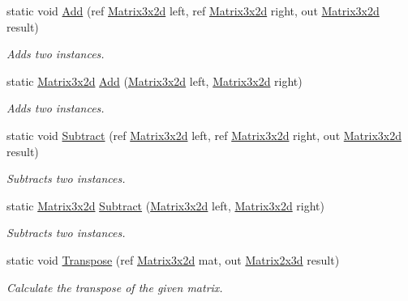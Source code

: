 \begin{DoxyCompactItemize}
static void \hyperlink{struct_open_t_k_1_1_matrix3x2d_aa00305c3c55da011e4412cc78a093349}{Add} (ref \hyperlink{struct_open_t_k_1_1_matrix3x2d}{Matrix3x2d} left, ref \hyperlink{struct_open_t_k_1_1_matrix3x2d}{Matrix3x2d} right, out \hyperlink{struct_open_t_k_1_1_matrix3x2d}{Matrix3x2d} result)
\begin{DoxyCompactList}\small\item\em Adds two instances. \end{DoxyCompactList}\item 
static \hyperlink{struct_open_t_k_1_1_matrix3x2d}{Matrix3x2d} \hyperlink{struct_open_t_k_1_1_matrix3x2d_a640abe7d4ec769b1b062807654ac9181}{Add} (\hyperlink{struct_open_t_k_1_1_matrix3x2d}{Matrix3x2d} left, \hyperlink{struct_open_t_k_1_1_matrix3x2d}{Matrix3x2d} right)
\begin{DoxyCompactList}\small\item\em Adds two instances. \end{DoxyCompactList}\item 
static void \hyperlink{struct_open_t_k_1_1_matrix3x2d_a1d972e6d5c2b25350d0e4a3e55cdb835}{Subtract} (ref \hyperlink{struct_open_t_k_1_1_matrix3x2d}{Matrix3x2d} left, ref \hyperlink{struct_open_t_k_1_1_matrix3x2d}{Matrix3x2d} right, out \hyperlink{struct_open_t_k_1_1_matrix3x2d}{Matrix3x2d} result)
\begin{DoxyCompactList}\small\item\em Subtracts two instances. \end{DoxyCompactList}\item 
static \hyperlink{struct_open_t_k_1_1_matrix3x2d}{Matrix3x2d} \hyperlink{struct_open_t_k_1_1_matrix3x2d_aaea8343af222e10708f283d7e1652db9}{Subtract} (\hyperlink{struct_open_t_k_1_1_matrix3x2d}{Matrix3x2d} left, \hyperlink{struct_open_t_k_1_1_matrix3x2d}{Matrix3x2d} right)
\begin{DoxyCompactList}\small\item\em Subtracts two instances. \end{DoxyCompactList}\item 
static void \hyperlink{struct_open_t_k_1_1_matrix3x2d_a6e14ab584c81a42305f05ccefbd00722}{Transpose} (ref \hyperlink{struct_open_t_k_1_1_matrix3x2d}{Matrix3x2d} mat, out \hyperlink{struct_open_t_k_1_1_matrix2x3d}{Matrix2x3d} result)
\begin{DoxyCompactList}\small\item\em Calculate the transpose of the given matrix. \end{DoxyCompactList}\item 

\end{DoxyCompactItemize}
